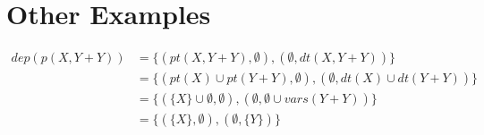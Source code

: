 \documentclass{article}
\newcommand{\set}[1]{\{#1\}}
\newcommand{\dep}[2]{\{(#1), (#2)\}}
\begin{document}
	\section{Other Examples}
	\begin{align*}
		dep(p(X,Y+Y)) &= \dep{pt(X,Y+Y), \emptyset}{\emptyset, dt(X,Y+Y)}
		\\ &= \dep{pt(X) \cup pt(Y+Y), \emptyset}{\emptyset, dt(X) \cup dt(Y+Y)}
		\\ &= \dep{\set{X} \cup \emptyset, \emptyset}{\emptyset, \emptyset \cup vars(Y+Y)}
		\\ &= \dep{\set{X}, \emptyset}{\emptyset, \set{Y}}
	\end{align*}
\end{document}
